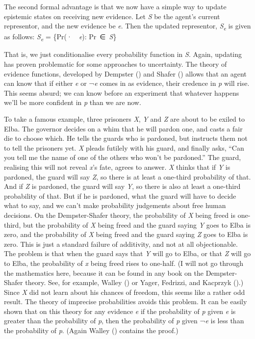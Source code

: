 \documentclass[
  10pt,
  letterpaper,
  DIV=11,
  numbers=noendperiod,
  twoside]{scrartcl}
\begin{document}
The second formal advantage is that we now have a simple way to update
epistemic states on receiving new evidence. Let \emph{S} be the agent's
current representor, and the new evidence be \emph{e}. Then the updated
representor, \emph{S\textsubscript{e}} is given as follows:
\emph{S\textsubscript{e}} = \{Pr(·~\textbar~\emph{e}): Pr~∈~\emph{S}\}

That is, we just conditionalise every probability function in \emph{S}.
Again, updating has proven problematic for some approaches to
uncertainty. The theory of evidence functions, developed by Dempster
() and Shafer
() allows that an agent can know that if
either \emph{e} or ¬\emph{e} comes in as evidence, their credence in
\emph{p} will rise. This seems absurd; we can know before an experiment
that whatever happens we'll be more confident in \emph{p} than we are
now.

To take a famous example, three prisoners \emph{X}, \emph{Y} and
\emph{Z} are about to be exiled to Elba. The governor decides on a whim
that he will pardon one, and casts a fair die to choose which. He tells
the guards who is pardoned, but instructs them not to tell the prisoners
yet. \emph{X} pleads futilely with his guard, and finally asks, ``Can
you tell me the name of one of the others who won't be pardoned.'' The
guard, realising this will not reveal \emph{x}'s fate, agrees to answer.
\emph{X} thinks that if \emph{Y} is pardoned, the guard will say
\emph{Z}, so there is at least a one-third probability of that. And if
\emph{Z} is pardoned, the guard will say \emph{Y}, so there is also at
least a one-third probability of that. But if he is pardoned, what the
guard will have to decide what to say, and we can't make probability
judgements about free human decisions. On the Dempster-Shafer theory,
the probability of \emph{X} being freed is one-third, but the
probability of \emph{X} being freed and the guard saying \emph{Y} goes
to Elba is zero, and the probability of \emph{X} being freed and the
guard saying \emph{Z} goes to Elba is zero. This is just a standard
failure of additivity, and not at all objectionable. The problem is that
when the guard says that \emph{Y} will go to Elba, or that \emph{Z} will
go to Elba, the probability of \emph{x} being freed rises to one-half.
(I will not go through the mathematics here, because it can be found in
any book on the Dempster-Shafer theory. See, for example, Walley
() or Yager, Fedrizzi, and Kacprzyk
().) Since \emph{X} did not learn about
his chances of freedom, this seems like a rather odd result. The theory
of imprecise probabilities avoids this problem. It can be easily shown
that on this theory for any evidence \emph{e} if the probability of
\emph{p} given \emph{e} is greater than the probability of \emph{p},
then the probability of \emph{p} given ¬\emph{e} is less than the
probability of \emph{p}. (Again Walley ()
contains the proof.)
\end{document}
